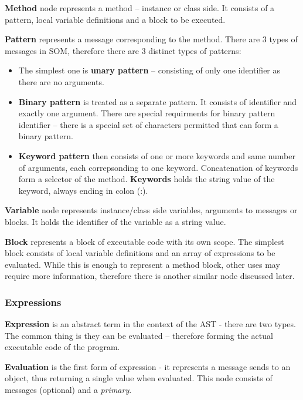 \documentclass[thesis=M,english]{FITthesis}[2019/12/23]
\begin{document}
\textbf{Method} node represents a method -- instance or class side. It consists of a pattern, local variable definitions and a block
to be executed.

\textbf{Pattern} represents a message corresponding to the method. There are 3 types of messages in SOM, therefore there are 3 distinct
types of patterns:
\begin{itemize}
	\item The simplest one is \textbf{unary pattern} -- consisting of only one identifier as there are no arguments.
	\item \textbf{Binary pattern} is treated as a separate pattern. It consists of identifier and exactly one argument. 
		There are special requirments for binary pattern identifier -- there is a special set of characters permitted 
		that can form a binary pattern.
	\item \textbf{Keyword pattern} then consists of one or more keywords and same number of arguments, each correpsonding 
		to one keyword. Concatenation of keywords form a selector of the method. \textbf{Keywords} holds the string
		value of the keyword, always ending in colon (:).
\end{itemize}


  

\textbf{Variable} node represents instance/class side variables, arguments to messages or blocks. It holds the identifier of the variable as a string value.

\textbf{Block} represents a block of executable code with its own scope. The simplest block consists of local variable definitions and an array of
expressions to be evaluated. While this is enough to represent a method block, other uses may require more information, therefore there is another
similar node discussed later.

\subsubsection{Expressions}
\textbf{Expression} is an abstract term in the context of the AST - there are two types. The common thing is they can be evaluated -- therefore forming
the actual executable code of the program. 

\textbf{Evaluation} is the first form of expression - it represents a message sends to an object, thus returning a single value when evaluated. This node
consists of messages (optional) and a \textit{primary}.
\end{document}
